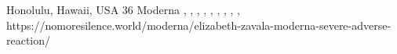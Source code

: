           {
            Honolulu, Hawaii, USA
          }
          {
            36
          }
          {
            Moderna
          }
          {
          }
          {
            ,
            ,
            ,
            ,
            ,
            ,
            ,
            ,
            ,
          }
          {
            https://nomoresilence.world/moderna/elizabeth-zavala-moderna-severe-adverse-reaction/
          }

